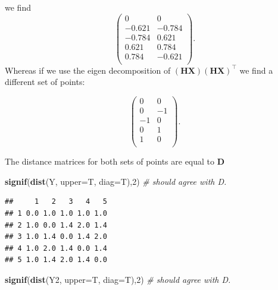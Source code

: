 \documentclass[
]{book}
\newenvironment{Shaded}{\begin{snugshade}}{\end{snugshade}}
\newcommand{\AttributeTok}[1]{\textcolor[rgb]{0.13,0.29,0.53}{#1}}
\newcommand{\CommentTok}[1]{\textcolor[rgb]{0.56,0.35,0.01}{\textit{#1}}}
\newcommand{\DecValTok}[1]{\textcolor[rgb]{0.00,0.00,0.81}{#1}}
\newcommand{\FunctionTok}[1]{\textcolor[rgb]{0.13,0.29,0.53}{\textbf{#1}}}
\newcommand{\NormalTok}[1]{#1}
\newcommand{\OtherTok}[1]{\textcolor[rgb]{0.56,0.35,0.01}{#1}}
\newcommand{\SpecialCharTok}[1]{\textcolor[rgb]{0.81,0.36,0.00}{\textbf{#1}}}
\theoremstyle{definition}
\theoremstyle{definition}
\theoremstyle{definition}
\theoremstyle{definition}
\theoremstyle{remark}
\begin{document}
we find
\[\begin{pmatrix}0&0 \\-0.621&-0.784 \\-0.784&0.621 \\0.621&0.784 \\0.784&-0.621 \\\end{pmatrix}.\]
Whereas if we use the eigen decomposition of \((\mathbf H\mathbf X)(\mathbf H\mathbf X)^\top\) we find a different set of points:

\begin{Shaded}
\end{Shaded}

\[\begin{pmatrix}0&0 \\0&-1 \\-1&0 \\0&1 \\1&0 \\\end{pmatrix}.\]

The distance matrices for both sets of points are equal to \(\mathbf D\)

\begin{Shaded}
\begin{Highlighting}[]
\FunctionTok{signif}\NormalTok{(}\FunctionTok{dist}\NormalTok{(Y, }\AttributeTok{upper=}\NormalTok{T, }\AttributeTok{diag=}\NormalTok{T),}\DecValTok{2}\NormalTok{) }\CommentTok{\# should agree with D.}
\end{Highlighting}
\end{Shaded}

\begin{verbatim}
##     1   2   3   4   5
## 1 0.0 1.0 1.0 1.0 1.0
## 2 1.0 0.0 1.4 2.0 1.4
## 3 1.0 1.4 0.0 1.4 2.0
## 4 1.0 2.0 1.4 0.0 1.4
## 5 1.0 1.4 2.0 1.4 0.0
\end{verbatim}

\begin{Shaded}
\begin{Highlighting}[]
\FunctionTok{signif}\NormalTok{(}\FunctionTok{dist}\NormalTok{(Y2, }\AttributeTok{upper=}\NormalTok{T, }\AttributeTok{diag=}\NormalTok{T),}\DecValTok{2}\NormalTok{) }\CommentTok{\# should agree with D.}
\end{Highlighting}
\end{Shaded}
\end{document}
